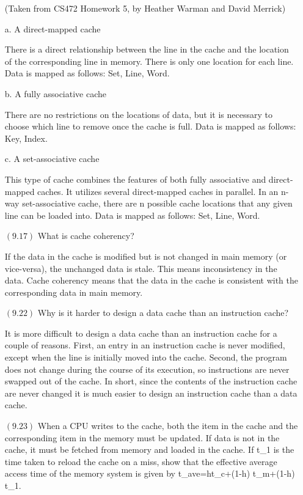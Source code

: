 \documentclass[letterpaper,10pt,titlepage]{article}
\begin{document}
\begin{enumerate}
(Taken from CS472 Homework 5, by Heather Warman and David Merrick)

a. A direct-mapped cache 

There is a direct relationship between the line in the cache and the location of the corresponding line in memory. There is only one location for each line. Data is mapped as follows: Set, Line, Word.

b. A fully associative cache 

There are no restrictions on the locations of data, but it is necessary to choose which line to remove once the cache is full. Data is mapped as follows: Key, Index.

c. A set-associative cache

This type of cache combines the features of both fully associative and direct-mapped caches. It utilizes several direct-mapped caches in parallel. In an n-way set-associative cache, there are n possible cache locations that any given line can be loaded into.
Data is mapped as follows: Set, Line, Word.


\item[$(9.17)$] What is cache coherency?

If the data in the cache is modified but is not changed in main memory (or vice-versa), the unchanged data is stale. This means inconsistency in the data. Cache coherency means that the data in the cache is consistent with the corresponding data in main memory.


\item[$(9.22)$] Why is it harder to design a data cache than an instruction cache?

It is more difficult to design a data cache than an instruction cache for a couple of reasons. First, an entry in an instruction cache is never modified, except when the line is initially moved into the cache. Second, the program does not change during the course of its execution, so instructions are never swapped out of the cache. In short, since the contents of the instruction cache are never changed it is much easier to design an instruction cache than a data cache. 


\item[$(9.23)$] When a CPU writes to the cache, both the item in the cache and the corresponding item in the memory must be updated. If data is not in the cache, it must be fetched from memory and loaded in the cache. If t_1 is the time taken to reload the cache on a miss, show that the effective average access time of the memory system is given by t\_ave=ht\_c+(1-h) t\_m+(1-h) t\_1.


\end{enumerate}
\end{document}

